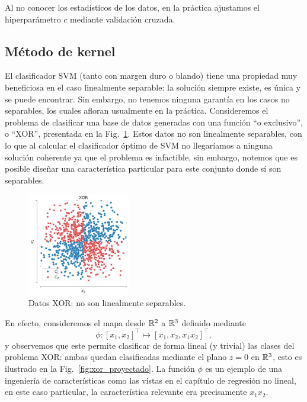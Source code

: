 Al no conocer los estadísticos de los datos, en la práctica ajustamos el hiperparámetro $c$ mediante validación cruzada.

\subsection{Método de kernel}

El clasificador SVM (tanto con margen duro o blando) tiene una propiedad muy beneficiosa en el caso linealmente separable: la solución siempre existe, es única y se puede encontrar. Sin embargo, no tenemos ninguna garantía en los casos no separables, los cuales afloran usualmente en la práctica. Consideremos el problema de clasificar una base de datos generadas con una función ``o exclusivo'', o ``XOR'', presentada en la Fig.~\ref{fig:xor}. Estos datos no son linealmente separables, con lo que al calcular el clasificador óptimo  de SVM no llegaríamos a ninguna solución coherente ya que el problema es infactible, sin embargo, notemos que es posible diseñar una característica particular para este conjunto donde sí son separables. 

\begin{figure}[ht]
    \centering
    \includegraphics[width=0.4\textwidth]{img/cap5_xor}
    \caption{Datos XOR: no son linealmente separables.}
    \label{fig:xor}
\end{figure}

En efecto, consideremos el mapa desde  $\mathbb{R}^2$ a $\mathbb{R}^3$ definido mediante
\begin{equation}
    \phi: [x_1, x_2]^\top \mapsto [x_1, x_2, x_1 x_2]^\top,
\end{equation}
y observemos que este permite clasificar de forma lineal (y trivial) las clases del problema XOR: ambas quedan clasificadas mediante el plano $z=0$ en $\mathbb{R}^3$, esto es ilustrado en la Fig.~\ref{fig:xor_proyectado}. La función $\phi$ es un ejemplo de una ingeniería de características como las vistas en el capítulo de regresión no lineal, en este caso particular, la característica relevante era precisamente $x_1x_2$.

